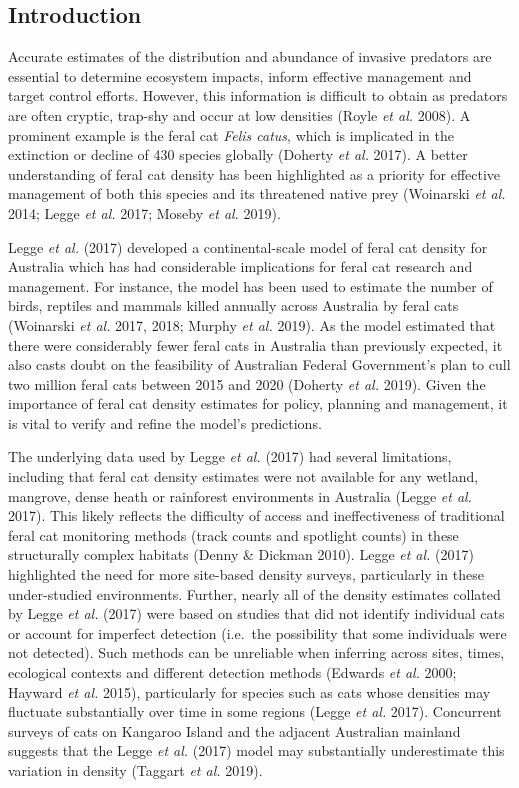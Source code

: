\documentclass[11pt,a4paper,titlepage,twoside,openright]{style/unimelbthesis}
\begin{document}
\begin{mainmatter}
\newpage

\hypertarget{introduction-3}{%
\section{Introduction}\label{introduction-3}}

Accurate estimates of the distribution and abundance of invasive predators are essential to determine ecosystem impacts, inform effective management and target control efforts. However, this information is difficult to obtain as predators are often cryptic, trap-shy and occur at low densities (Royle \emph{et al.} 2008). A prominent example is the feral cat \emph{Felis catus}, which is implicated in the extinction or decline of 430 species globally (Doherty \emph{et al.} 2017). A better understanding of feral cat density has been highlighted as a priority for effective management of both this species and its threatened native prey (Woinarski \emph{et al.} 2014; Legge \emph{et al.} 2017; Moseby \emph{et al.} 2019).

Legge \emph{et al.} (2017) developed a continental-scale model of feral cat density for Australia which has had considerable implications for feral cat research and management. For instance, the model has been used to estimate the number of birds, reptiles and mammals killed annually across Australia by feral cats (Woinarski \emph{et al.} 2017, 2018; Murphy \emph{et al.} 2019). As the model estimated that there were considerably fewer feral cats in Australia than previously expected, it also casts doubt on the feasibility of Australian Federal Government's plan to cull two million feral cats between 2015 and 2020 (Doherty \emph{et al.} 2019). Given the importance of feral cat density estimates for policy, planning and management, it is vital to verify and refine the model's predictions.

The underlying data used by Legge \emph{et al.} (2017) had several limitations, including that feral cat density estimates were not available for any wetland, mangrove, dense heath or rainforest environments in Australia (Legge \emph{et al.} 2017). This likely reflects the difficulty of access and ineffectiveness of traditional feral cat monitoring methods (track counts and spotlight counts) in these structurally complex habitats (Denny \& Dickman 2010). Legge \emph{et al.} (2017) highlighted the need for more site-based density surveys, particularly in these under-studied environments. Further, nearly all of the density estimates collated by Legge \emph{et al.} (2017) were based on studies that did not identify individual cats or account for imperfect detection (i.e.~the possibility that some individuals were not detected). Such methods can be unreliable when inferring across sites, times, ecological contexts and different detection methods (Edwards \emph{et al.} 2000; Hayward \emph{et al.} 2015), particularly for species such as cats whose densities may fluctuate substantially over time in some regions (Legge \emph{et al.} 2017). Concurrent surveys of cats on Kangaroo Island and the adjacent Australian mainland suggests that the Legge \emph{et al.} (2017) model may substantially underestimate this variation in density (Taggart \emph{et al.} 2019).


\end{mainmatter}
\end{document}
